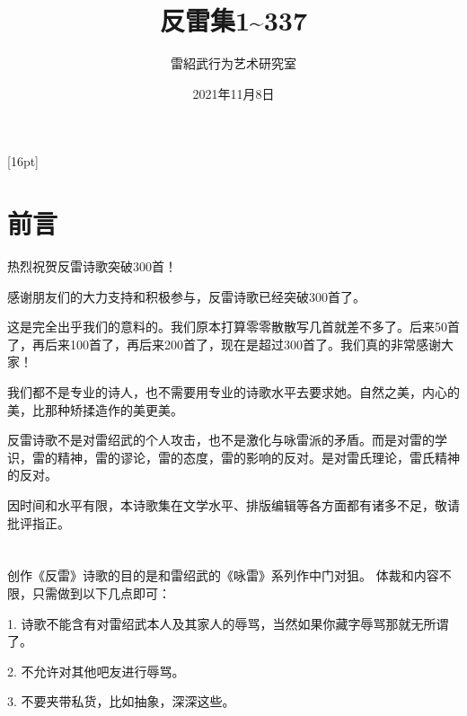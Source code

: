 \documentclass[UTF8,12pt,oneside]{ctexbook}
\title{\fontsize{42}{84}\textbf{反雷集1\textasciitilde 337}}
\author{\LARGE \kaishu 雷紹武行为艺术研究室}
\date{\LARGE 2021年11月8日}
\begin{document}
    \large
    
    \maketitle %
    
    \setcounter{secnumdepth}{-2} 
    \setcounter{tocdepth}{1}
    [16pt]{\addvspace{2pt}\filright}
    {\contentspush{\thecontentslabel\hspace{0.8em}}}
    {}{\contentspage}

    \chapter{前言}

    热烈祝贺反雷诗歌突破300首！

    感谢朋友们的大力支持和积极参与，反雷诗歌已经突破300首了。
    
    这是完全出乎我们的意料的。我们原本打算零零散散写几首就差不多了。后来50首了，再后来100首了，再后来200首了，现在是超过300首了。我们真的非常感谢大家！

    我们都不是专业的诗人，也不需要用专业的诗歌水平去要求她。自然之美，内心的美，比那种矫揉造作的美更美。

    反雷诗歌不是对雷绍武的个人攻击，也不是激化与咏雷派的矛盾。而是对雷的学识，雷的精神，雷的谬论，雷的态度，雷的影响的反对。是对雷氏理论，雷氏精神的反对。

    因时间和水平有限，本诗歌集在文学水平、排版编辑等各方面都有诸多不足，敬请批评指正。
    
    \tableofcontents

    \chapter{}
    创作《反雷》诗歌的目的是和雷绍武的《咏雷》系列作中门对狙。
    体裁和内容不限，只需做到以下几点即可：
    
    1. 诗歌不能含有对雷绍武本人及其家人的辱骂，当然如果你藏字辱骂那就无所谓了。
    
    2. 不允许对其他吧友进行辱骂。
    
    3. 不要夹带私货，比如抽象，深深这些。
    
    \begin{flushright}
        \songti
    \end{flushright}
    
\end{document}

